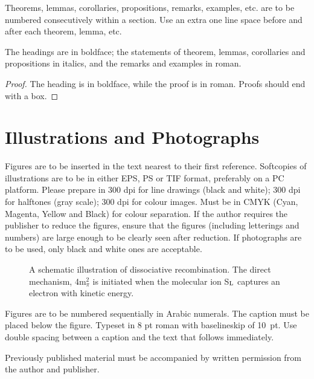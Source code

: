 \documentclass{ws-ijnt}
\begin{document}
\begin{theorem}
Theorems, lemmas, corollaries, propositions, remarks, 
examples, etc. are to be numbered consecutively within a section.  
Use an extra one line space before and after each theorem, 
lemma, etc.
\end{theorem}

\begin{lemma}
The headings are in boldface; the statements of theorem, 
lemmas, corollaries and propositions in italics, and the 
remarks and examples in roman.
\end{lemma}

\begin{proof}
The heading is in boldface, while the proof is in roman. 
Proofs should end with a box.
\end{proof}

\section{Illustrations and Photographs}
Figures are to be inserted in the text nearest to their first 
reference. Softcopies of illustrations are to be in either EPS, PS
or TIF format, preferably on a PC platform. Please prepare in 
300 dpi for line drawings (black and white); 
300 dpi for halftones (gray scale); 
300 dpi for colour images. Must be in CMYK (Cyan, Magenta,
Yellow and Black) for colour separation. If the author requires the
publisher to reduce the figures, ensure that the figures (including
letterings and numbers) are large enough to be clearly seen after
reduction. If photographs are to be used, only black and white ones
are acceptable.

\begin{figure}[ph]
\centerline{} %
\vspace*{8pt}
\caption{A schematic illustration of dissociative recombination. The
direct mechanism, 4m$^2_\pi$ is initiated when the
molecular ion S$_{\rm L}$ captures an electron with 
kinetic energy.\label{fig1}}
\end{figure}

Figures are to be numbered sequentially in Arabic numerals. The
caption must be placed below the figure. Typeset in 8 pt roman with
baselineskip of 10~pt. Use double spacing between a caption and the text
that follows immediately.

Previously published material must be accompanied by written
permission from the author and publisher.
\end{document}
